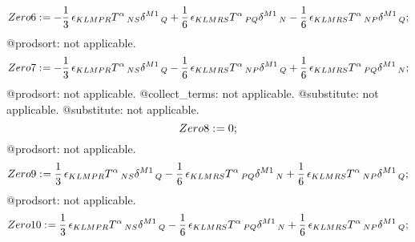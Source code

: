 \documentclass[11pt]{article}
\def\specialcolon{\mathrel{\mathop{:}}\hspace{-.5em}}
\begin{document}
\begin{dmath*}[compact, spread=2pt]
Zero6\specialcolon{}=  - \frac{1}{3}\, {\epsilon}_{K L M P R} {T}^{\alpha}\,_{N S} {\delta}^{M1}\,_{Q} + \frac{1}{6}\, {\epsilon}_{K L M R S} {T}^{\alpha}\,_{P Q} {\delta}^{M1}\,_{N} - \frac{1}{6}\, {\epsilon}_{K L M R S} {T}^{\alpha}\,_{N P} {\delta}^{M1}\,_{Q};
\end{dmath*}
@prodsort: not applicable.
\begin{dmath*}[compact, spread=2pt]
Zero7\specialcolon{}=  - \frac{1}{3}\, {\epsilon}_{K L M P R} {T}^{\alpha}\,_{N S} {\delta}^{M1}\,_{Q} - \frac{1}{6}\, {\epsilon}_{K L M R S} {T}^{\alpha}\,_{N P} {\delta}^{M1}\,_{Q} + \frac{1}{6}\, {\epsilon}_{K L M R S} {T}^{\alpha}\,_{P Q} {\delta}^{M1}\,_{N};
\end{dmath*}
@prodsort: not applicable.
@collect\_terms: not applicable.
@substitute: not applicable.
@substitute: not applicable.
\begin{dmath*}[compact, spread=2pt]
Zero8\specialcolon{}= 0;
\end{dmath*}
@prodsort: not applicable.
\begin{dmath*}[compact, spread=2pt]
Zero9\specialcolon{}= \frac{1}{3}\, {\epsilon}_{K L M P R} {T}^{\alpha}\,_{N S} {\delta}^{M1}\,_{Q} - \frac{1}{6}\, {\epsilon}_{K L M R S} {T}^{\alpha}\,_{P Q} {\delta}^{M1}\,_{N} + \frac{1}{6}\, {\epsilon}_{K L M R S} {T}^{\alpha}\,_{N P} {\delta}^{M1}\,_{Q};
\end{dmath*}
@prodsort: not applicable.
\begin{dmath*}[compact, spread=2pt]
Zero10\specialcolon{}= \frac{1}{3}\, {\epsilon}_{K L M P R} {T}^{\alpha}\,_{N S} {\delta}^{M1}\,_{Q} - \frac{1}{6}\, {\epsilon}_{K L M R S} {T}^{\alpha}\,_{P Q} {\delta}^{M1}\,_{N} + \frac{1}{6}\, {\epsilon}_{K L M R S} {T}^{\alpha}\,_{N P} {\delta}^{M1}\,_{Q};
\end{dmath*}
\end{document}
